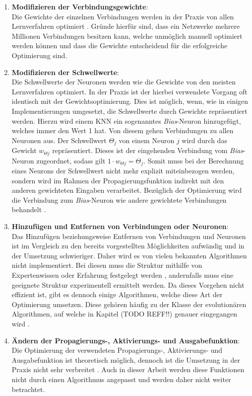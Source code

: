 \begin{enumerate}
	\item \textbf{Modifizieren der Verbindungsgewichte}:\\
	Die Gewichte der einzelnen Verbindungen werden in der Praxis von allen Lernverfahren optimiert \cite{zell2003simulation}. Gründe hierfür sind, dass ein Netzwerke mehrere Millionen Verbindungen besitzen kann, welche unmöglich manuell optimiert werden können und dass die Gewichte entscheidend für die erfolgreiche Optimierung sind.

	\item\textbf{Modifizieren der Schwellwerte}:\\
	Die Schwellwerte der Neuronen werden wie die Gewichte von den meisten Lernverfahren optimiert. In der Praxis ist der hierbei verwendete Vorgang oft identisch mit der Gewichtsoptimierung. Dies ist möglich, wenn, wie in einigen Implementierungen umgesetzt, die Schwellwerte durch Gewichte repräsentiert werden. Hierzu wird einem \ac{KNN} ein sogenanntes \emph{Bias}-Neuron hinzugefügt, welches immer den Wert 1 hat. Von diesem gehen Verbindungen zu allen Neuronen aus. Der Schwellwert $\Theta_j$ von einem Neuron $j$ wird durch das Gewicht $w_{\Theta j}$ repräsentiert. Dieses ist der eingehenden Verbindung vom \emph{Bias}-Neuron zugeordnet, sodass gilt $1\cdot w_{\Theta j} = \Theta_j$. Somit muss bei der Berechnung eines Neurons der Schwellwert nicht mehr explizit miteinbezogen werden, sondern wird im Rahmen der Propagierungsfunktion indirekt mit den anderen gewichteten Eingaben verarbeitet. Bezüglich der Optimierung wird die Verbindung zum \emph{Bias}-Neuron wie andere gewichtete Verbindungen behandelt \cite{zell2003simulation}.
	\item \textbf{Hinzufügen und Entfernen von Verbindungen oder Neuronen}:\\
	Das Hinzufügen beziehungsweise Entfernen von Verbindungen und Neuronen ist im Vergleich zu den bereits vorgestellten Möglichkeiten aufwändig und in der Umsetzung schwieriger. Daher wird es von vielen bekannten Algorithmen nicht implementiert. Bei diesen muss die Struktur mithilfe von Expertenwissen oder Erfahrung festgelegt werden \cite{stanley2017oreilly}, andernfalls muss eine geeignete Struktur experimentell ermittelt werden. Da dieses Vorgehen nicht effizient ist, gibt es dennoch einige Algorithmen, welche diese Art der Optimierung umsetzen. Diese gehören häufig zu der Klasse der evolutionären Algorithmen, auf welche in Kapitel (TODO REFF!!) genauer eingegangen wird \cite{kriesel2008kleiner}.
	
	\item \textbf{Ändern der Propagierungs-, Aktivierungs- und Ausgabefunktion}:\\
	Die Optimierung der verwendeten Propagierungs-, Aktivierungs- und Ausgabefunktion ist theoretisch möglich, dennoch ist die Umsetzung in der Praxis nicht sehr verbreitet \cite{zell2003simulation}. Auch in dieser Arbeit werden diese Funktionen nicht durch einen Algorithmus angepasst und werden daher nicht weiter betrachtet. 
\end{enumerate}

